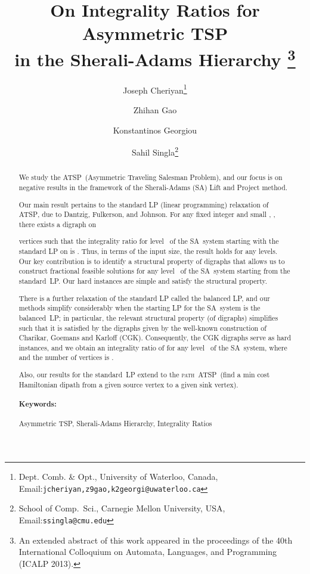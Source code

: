 \documentclass[11pt]{article}
\newcommand{\iSA}{\textsf{SA}}
\newcommand{\atsp}{\textsc{ATSP}}
\newcommand{\pathatsp}{\textsc{path~ATSP}}
\begin{document}
\title{On Integrality Ratios for Asymmetric TSP \\
	in the Sherali-Adams Hierarchy
\footnote{An extended abstract of this work appeared in the proceedings of the 40th International Colloquium on Automata, Languages, and Programming ({ICALP} 2013).}
}


\author{Joseph Cheriyan\thanks{
 Dept. Comb. \& Opt., University of Waterloo, Canada,
 Email:\texttt{jcheriyan,z9gao,k2georgi@uwaterloo.ca}} 
\and Zhihan Gao  
\and Konstantinos Georgiou 
\and
Sahil Singla\thanks{School of Comp.\ Sci., Carnegie Mellon University, USA, 
Email:\texttt{ssingla@cmu.edu}
}
}





\maketitle

\begin{abstract}
We study the \atsp\ (Asymmetric Traveling Salesman Problem), and our
focus is on negative results in the framework of the Sherali-Adams
(\iSA) Lift and Project method.


Our main result pertains to the standard LP (linear programming)
relaxation of \atsp, due to Dantzig, Fulkerson, and Johnson.
For any fixed integer  and small ,
,
there exists a digraph  on

vertices such that the integrality ratio for level~ of the \iSA\ system
starting with the standard LP on  is
.
Thus, in terms of the input size,
the result holds for any  levels.
Our key contribution is to identify
a structural property of digraphs that
allows us to construct fractional feasible solutions
for any level~ of the \iSA\ system starting from the standard~LP.
Our hard instances are simple and satisfy the structural property.

There is a further relaxation of the standard LP called the
balanced LP, and our methods simplify considerably
when the starting LP for the \iSA\ system is the balanced~LP;
in particular, the relevant structural property (of digraphs)
simplifies such that
it is satisfied by the digraphs given by
the well-known construction of Charikar, Goemans and Karloff (CGK).
Consequently, the CGK digraphs serve as hard instances,
and we obtain an integrality ratio of  
for any level~ of the \iSA\ system,
where 
and the number of vertices is
.

Also, our results for the standard~LP extend to the \pathatsp\ (find a
min cost Hamiltonian dipath from a given source vertex to a given sink
vertex).

\paragraph{Keywords:}Asymmetric TSP, Sherali-Adams Hierarchy, Integrality Ratios
\end{abstract}
\end{document}
